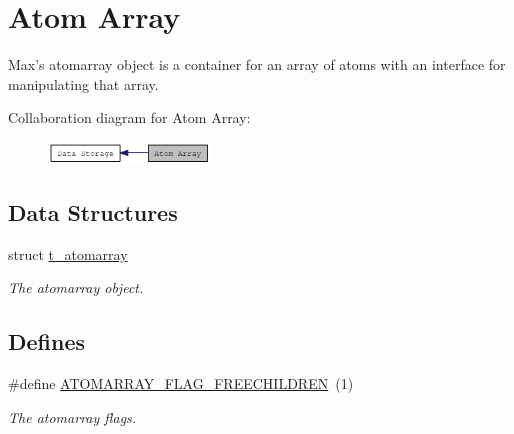 \hypertarget{group__atomarray}{
\section{Atom Array}
\label{group__atomarray}
}


Max's atomarray object is a container for an array of atoms with an interface for manipulating that array.  


Collaboration diagram for Atom Array:\nopagebreak
\begin{figure}[H]
\begin{center}
\leavevmode
\includegraphics[width=122pt]{group__atomarray}
\end{center}
\end{figure}
\subsection*{Data Structures}
\begin{DoxyCompactItemize}
\item 
struct \hyperlink{structt__atomarray}{t\_\-atomarray}
\begin{DoxyCompactList}\small\item\em The atomarray object. \item\end{DoxyCompactList}\end{DoxyCompactItemize}
\subsection*{Defines}
\begin{DoxyCompactItemize}
\item 
\#define \hyperlink{group__atomarray_ga9d4f9396731ae8115a08f99d02421d02}{ATOMARRAY\_\-FLAG\_\-FREECHILDREN}~(1)
\begin{DoxyCompactList}\small\item\em The atomarray flags. \item\end{DoxyCompactList}\end{DoxyCompactItemize}
